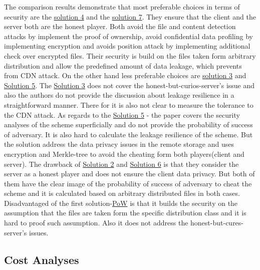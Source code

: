 \documentclass[12pt]{article}
\begin{document}
The comparison results demonstrate that most preferable choices in terms of security are the \hyperref[sub:Soltuion4]{solution 4} and the \hyperref[sub:Soltuion7]{solution 7}. They ensure that the client and the server both are the honest player. Both avoid the file and content detection attacks by implement the proof of ownership, avoid confidential data profiling by implementing  encryption and avoids position attack by implementing additional check over encrypted files. Their security is build on the files taken form arbitrary distribution and allow the predefined amount of data leakage, which prevents from CDN attack. On the other hand less preferable choices are  \hyperref[sub:Soltuion3]{solution 3} and \hyperref[sub:Soltuion5]{Solution 5}. The \hyperref[sub:Soltuion3]{Solution 3}  does not cover the honest-but-curios-server's issue and also the authors do not provide the discussion about leakage resilience in a straightforward manner. There for it is also not clear to measure the tolerance to the CDN attack. As regards to the \hyperref[sub:Soltuion5]{Solution 5} - the paper covers the security analyses of the scheme  superficially and do not provide the probability of success of adversary. It is also hard to calculate the leakage resilience of the scheme. But the solution  address the  data privacy issues in the remote storage and uses encryption and Merkle-tree to avoid the cheating form both players(client and server). The drawback of \hyperref[sub:Soltuion2]{Solution 2} and \hyperref[sub:Soltuion6]{Solution 6} is that they consider the server as a honest player and does not ensure the client data privacy. But both of them have the clear image of the probability of success of adversary to cheat the scheme and it is calculated based on arbitrary distributed files in both cases. Disadvantaged of the first solution-\hyperref[sub:Soltuion1] {PoW} is that it builds the security on the assumption that the files are taken form the specific distribution class and it is hard to proof such assumption. Also it does not address the honest-but-cures-server's issues.


\subsection{Cost Analyses}
\label{sub:Cost}
\end{document}
